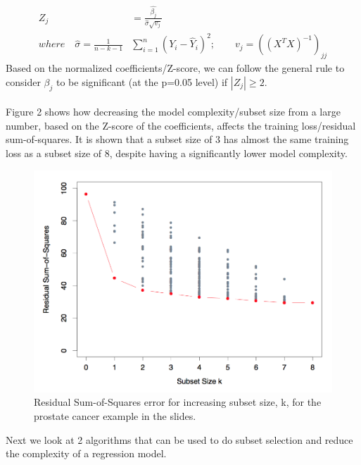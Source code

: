 \documentclass[a4paper]{article}
\begin{document}
\begin{align*}
    Z_j &= \frac{\hat{\beta_j}}{\hat{\sigma}\sqrt{v_j}}\\
    where \quad \hat{\sigma}=\frac{1}{n-k-1}&\sum_{i=1}^{n}{(Y_i-\hat{Y}_i)^2};\qquad 
    v_j=((X^TX)^{-1})_{jj}
\end{align*}
Based on the normalized coefficients/Z-score, we can follow the general rule to consider $\beta_j$ to be significant (at the p=0.05 level) if $|Z_j|\geq2$.\\
\\
Figure 2 shows how decreasing the model complexity/subset size from a large number, based on the Z-score of the coefficients, affects the training loss/residual sum-of-squares. It is shown that a subset size of 3 has almost the same training loss as a subset size of 8, despite having a significantly lower model complexity.

\begin{figure}[H]
\centering
\captionsetup{justification=centering}
\includegraphics[width=1\textwidth]{Figure_2.PNG}
\caption{\label{fig:2}Residual Sum-of-Squares error for increasing subset size, k, for the prostate cancer example in the slides.}
\end{figure}

\label{sec:subset}

\noindent Next we look at 2 algorithms that can be used to do subset selection and reduce the complexity of a regression model.
\end{document}
